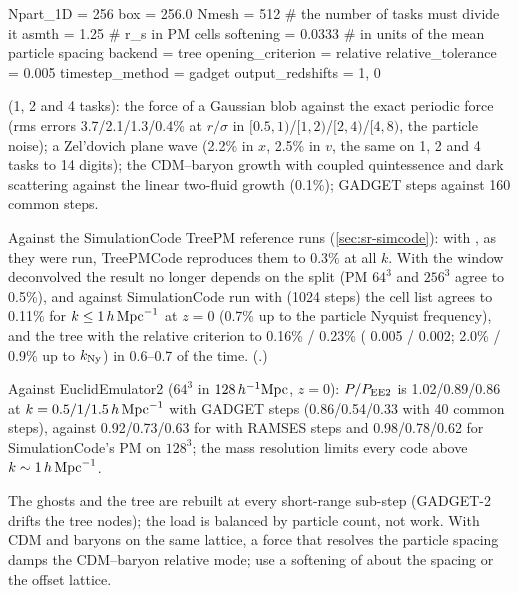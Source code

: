 \begin{paramfile}[TreePMCode (the parameter file is \code{key = value})]
Npart_1D   = 256
box        = 256.0
Nmesh      = 512        # the number of tasks must divide it
asmth      = 1.25       # r_s in PM cells
softening  = 0.0333     # in units of the mean particle spacing
backend    = tree
opening_criterion  = relative
relative_tolerance = 0.005
timestep_method    = gadget
output_redshifts   = 1, 0
\end{paramfile}

\begin{validation}
 (1, 2 and 4 tasks): the force of a Gaussian blob against the exact periodic force (rms errors
3.7/2.1/1.3/0.4\% at $r/\sigma$ in $[0.5,1)$/$[1,2)$/$[2,4)$/$[4,8)$, the particle noise); a Zel'dovich plane wave
(2.2\% in $x$, 2.5\% in $v$, the same on 1, 2 and 4 tasks to 14 digits); the CDM--baryon growth with coupled
quintessence and dark scattering against the linear two-fluid growth (0.1\%); GADGET steps against 160 common steps.

Against the SimulationCode TreePM reference runs (\cref{sec:sr-simcode}): with  , as
they were run, TreePMCode reproduces them to 0.3\% at all $k$. With the window deconvolved the result no longer depends
on the split (PM $64^3$ and $256^3$ agree to 0.5\%), and against SimulationCode run with
  (1024 steps) the cell list agrees to 0.11\% for $k\le1\,h\,\mathrm{Mpc}^{-1}$ at $z=0$
(0.7\% up to the particle Nyquist frequency), and the tree with the relative criterion to 0.16\% / 0.23\%
( 0.005 / 0.002; 2.0\% / 0.9\% up to $k_{\rm Ny}$) in 0.6--0.7 of the time.
(.)

Against EuclidEmulator2 \cite{Knabenhans2021} ($64^3$ in $128\,h^{-1}\mathrm{Mpc}$, $z=0$): $P/P_{\rm EE2}$ is 1.02/0.89/0.86 at
$k=0.5/1/1.5\,h\,\mathrm{Mpc}^{-1}$ with GADGET steps (0.86/0.54/0.33 with 40 common steps), against 0.92/0.73/0.63 for 
with RAMSES steps and 0.98/0.78/0.62 for SimulationCode's PM on $128^3$; the mass resolution limits every code above
$k\sim1\,h\,\mathrm{Mpc}^{-1}$.
\end{validation}

\begin{caveat}
The ghosts and the tree are rebuilt at every short-range sub-step (GADGET-2 drifts the tree nodes); the load is
balanced by particle count, not work. With CDM and baryons on the same lattice, a force that resolves the particle
spacing damps the CDM--baryon relative mode; use a softening of about the spacing or the offset lattice.
\end{caveat}
